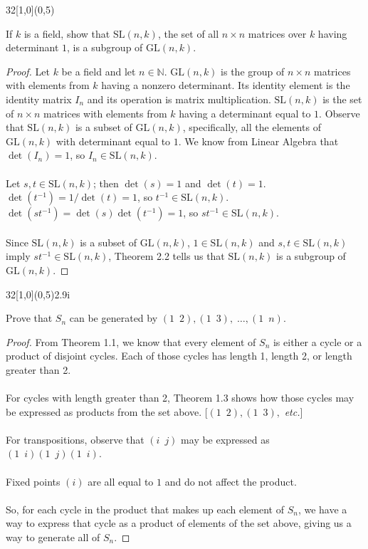 \documentclass[12pt]{article}
\newenvironment{exercise}[2]{\begin{textblock}{32}[1,0](0,#2)\noindent#1\end{textblock}}{\vspace{1in}}
\begin{document}
\begin{exercise}{2.2}{5}
	{\noindent}If $k$ is a field, show that $\text{SL}(n,k)$, the set of all $n\times n$ matrices over $k$ having determinant $1$, is a subgroup of $\text{GL}(n,k)$.
	\bigskip
	\begin{proof}
		Let $k$ be a field and let $n\in\mathbb{N}$. $\text{GL}(n,k)$ is the group of $n\times n$ matrices with elements from $k$ having a nonzero determinant. Its identity element is the identity matrix $I_n$ and its operation is matrix multiplication.
		$\text{SL}(n,k)$ is the set of $n\times n$ matrices with elements from $k$ having a determinant equal to $1$. Observe that $\text{SL}(n,k)$ is a subset of $\text{GL}(n,k)$, specifically, all the elements of $\text{GL}(n,k)$ with determinant equal to $1$.
		We know from Linear Algebra that $\det(I_n)=1$, so $I_n\in \text{SL}(n,k)$.\\
		\\
		Let $s,t\in\text{SL}(n,k)$; then $\det(s)=1$ and $\det(t)=1$. $\det(t^{-1})=1/\det(t)=1$, so $t^{-1}\in\text{SL}(n,k)$.
		$\det(st^{-1})=\det(s)\det(t^{-1})=1$, so $st^{-1}\in\text{SL}(n,k)$.\\
		\\
		Since $\text{SL}(n,k)$ is a subset of $\text{GL}(n,k)$, $1\in \text{SL}(n,k)$ and $s, t\in \text{SL}(n,k)$ imply $st^{-1}\in\text{SL}(n,k)$, Theorem 2.2 tells us that $\text{SL}(n,k)$ is a subgroup of $\text{GL}(n,k)$.
	\end{proof}
\end{exercise}

\begin{exercise}{2.9i}{5}
	{\noindent}Prove that $S_n$ can be generated by $(1\enspace 2), (1\enspace 3),\;\dotsc, (1\enspace n)$.
	\bigskip
	\begin{proof}
		From Theorem 1.1, we know that every element of $S_n$ is either a cycle or a product of disjoint cycles.
		Each of those cycles has length 1, length 2, or length greater than 2.\\
		\\
		For cycles with length greater than 2, Theorem 1.3 shows how those cycles may be expressed as products from the set above. [$(1\enspace 2), (1\enspace 3), $ \textit{etc.}]\\
		\\
		For transpositions, observe that $(i\enspace j)$ may be expressed as $(1\enspace i)(1\enspace j)(1\enspace i)$.\\
		\\
		Fixed points $(i)$ are all equal to $1$ and do not affect the product.\\
		\\
		So, for each cycle in the product that makes up each element of $S_n$, we have a way to express that cycle as a product of elements of the set above, giving us a way to generate all of $S_n$.
	\end{proof}
\end{exercise}
\end{document}

